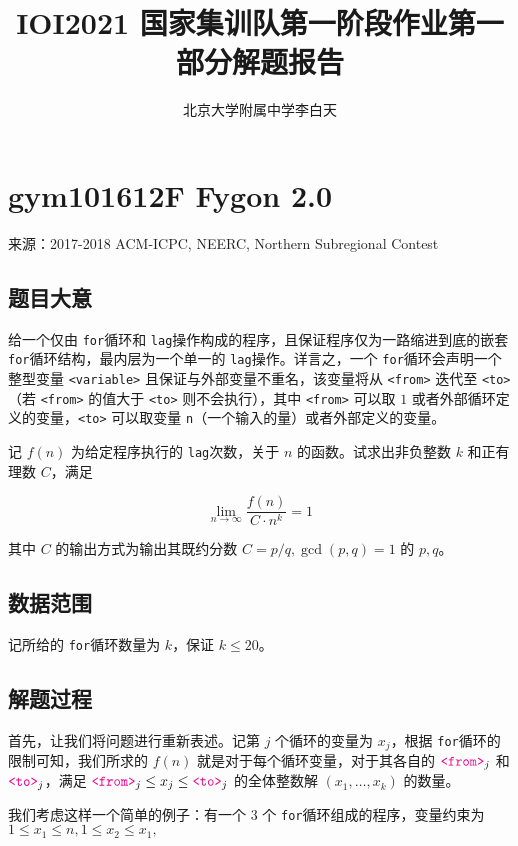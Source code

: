 \documentclass[12pt]{ctexart}
\title{IOI2021 国家集训队第一阶段作业第一部分解题报告}
\author{北京大学附属中学\quad 李白天}
\begin{document}
\maketitle

\section{gym101612F Fygon 2.0}

来源：2017-2018 ACM-ICPC, NEERC, Northern Subregional Contest

\subsection{题目大意}

\newcommand{\for}{\texttt{for}}
\newcommand{\lag}{\texttt{lag}}
\providecommand*{\var}[1]{{\color{magenta}\texttt{<#1>}}}

给一个仅由 \for 循环和 \lag 操作构成的程序，且保证程序仅为一路缩进到底的嵌套 \for 循环结构，最内层为一个单一的 \lag 操作。详言之，一个 \for 循环会声明一个整型变量 \var{variable} 且保证与外部变量不重名，该变量将从 \var{from} 迭代至 \var{to}（若 \var{from} 的值大于 \var{to} 则不会执行），其中 \var{from} 可以取 $1$ 或者外部循环定义的变量，\var{to} 可以取变量 \texttt{n}（一个输入的量）或者外部定义的变量。

记 $f(n)$ 为给定程序执行的 \lag 次数，关于 $n$ 的函数。试求出非负整数 $k$ 和正有理数 $C$，满足

$$
\lim_{n\rightarrow \infty} \frac{f(n)}{C\cdot n^k} = 1
$$

其中 $C$ 的输出方式为输出其既约分数 $C=p/q, \gcd(p,q)=1$ 的 $p,q$。

\subsection{数据范围}

记所给的 \for 循环数量为 $k$，保证 $k\le 20$。

\subsection{解题过程}

首先，让我们将问题进行重新表述。记第 $j$ 个循环的变量为 $x_j$，根据 \for 循环的限制可知，我们所求的 $f(n)$ 就是对于每个循环变量，对于其各自的 $\var{from}_j$ 和 $\var{to}_j$，满足 $\var{from}_j \le x_j \le \var{to}_j$ 的全体整数解 $(x_1, \dots, x_k)$ 的数量。

我们考虑这样一个简单的例子：有一个 $3$ 个 \for 循环组成的程序，变量约束为 $1\le x_1\le n, 1\le x_2\le x_1, $

\newpage
\end{document}
